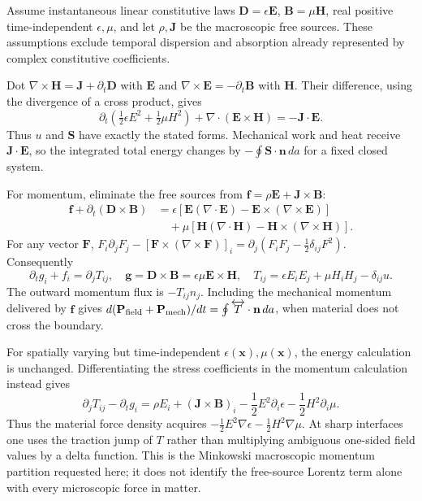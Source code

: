 Assume instantaneous linear constitutive laws $\mathbf D=\epsilon\mathbf E$,
$\mathbf B=\mu\mathbf H$, real positive time-independent $\epsilon,\mu$,
and let $\rho,\mathbf J$ be the macroscopic free sources. These assumptions
exclude temporal dispersion and absorption already represented by complex
constitutive coefficients.

Dot $\nabla\times\mathbf H=\mathbf J+\partial_t\mathbf D$ with $\mathbf E$
and $\nabla\times\mathbf E=-\partial_t\mathbf B$ with $\mathbf H$. Their
difference, using the divergence of a cross product, gives
\[
\partial_t\left(\tfrac12\epsilon E^2+\tfrac12\mu H^2\right)
+\nabla\cdot(\mathbf E\times\mathbf H)=-\mathbf J\cdot\mathbf E.
\]
Thus $u$ and $\mathbf S$ have exactly the stated forms. Mechanical work
and heat receive $\mathbf J\cdot\mathbf E$, so the integrated total energy
changes by $-\oint\mathbf S\cdot\mathbf n\,da$ for a fixed closed system.

For momentum, eliminate the free sources from
$\mathbf f=\rho\mathbf E+\mathbf J\times\mathbf B$:
\begin{align*}
\mathbf f+\partial_t(\mathbf D\times\mathbf B)
&=\epsilon[\mathbf E(\nabla\cdot\mathbf E)-\mathbf E\times(\nabla\times\mathbf E)]\\
&\quad+\mu[\mathbf H(\nabla\cdot\mathbf H)-\mathbf H\times(\nabla\times\mathbf H)].
\end{align*}
For any vector $\mathbf F$,
$F_i\partial_jF_j-[\mathbf F\times(\nabla\times\mathbf F)]_i
=\partial_j(F_iF_j-\tfrac12\delta_{ij}F^2)$.
Consequently
\[
\boxed{\partial_tg_i+f_i=\partial_jT_{ij},\quad
\mathbf g=\mathbf D\times\mathbf B=\epsilon\mu\mathbf E\times\mathbf H,\quad
T_{ij}=\epsilon E_iE_j+\mu H_iH_j-\delta_{ij}u.}
\]
The outward momentum flux is $-T_{ij}n_j$. Including the mechanical
momentum delivered by $\mathbf f$ gives
$d(\mathbf P_{\rm field}+\mathbf P_{\rm mech})/dt=\oint\overleftrightarrow T\cdot\mathbf n\,da$,
when material does not cross the boundary.

For spatially varying but time-independent $\epsilon(\mathbf x),\mu(\mathbf x)$,
the energy calculation is unchanged. Differentiating the stress coefficients
in the momentum calculation instead gives
\[
\partial_jT_{ij}-\partial_tg_i
=\rho E_i+(\mathbf J\times\mathbf B)_i
-\frac12E^2\partial_i\epsilon-\frac12H^2\partial_i\mu.
\]
Thus the material force density acquires
$-\tfrac12E^2\nabla\epsilon-\tfrac12H^2\nabla\mu$. At sharp interfaces
one uses the traction jump of $T$ rather than multiplying ambiguous
one-sided field values by a delta function. This is the Minkowski
macroscopic momentum partition requested here; it does not identify the
free-source Lorentz term alone with every microscopic force in matter.

